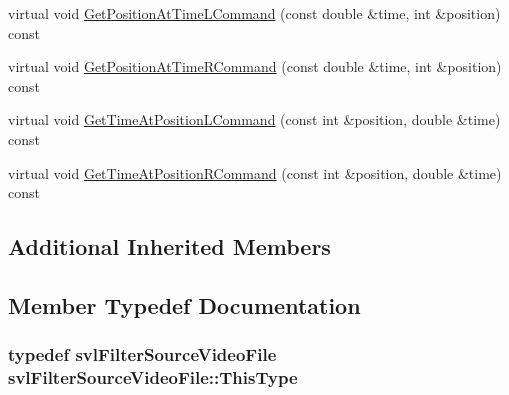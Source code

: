 \begin{DoxyCompactItemize}
\item 
virtual void \hyperlink{classsvl_filter_source_video_file_aeb8abbf0567077cc07192673abffff85}{Get\-Position\-At\-Time\-L\-Command} (const double \&time, int \&position) const 
\item 
virtual void \hyperlink{classsvl_filter_source_video_file_a5ae65a28b1825cd1fb7e85352e42ae11}{Get\-Position\-At\-Time\-R\-Command} (const double \&time, int \&position) const 
\item 
virtual void \hyperlink{classsvl_filter_source_video_file_ad48693c74ac3385a992b8d70c402328e}{Get\-Time\-At\-Position\-L\-Command} (const int \&position, double \&time) const 
\item 
virtual void \hyperlink{classsvl_filter_source_video_file_a96d2938f3efb2c427021b17bad5b8976}{Get\-Time\-At\-Position\-R\-Command} (const int \&position, double \&time) const 
\end{DoxyCompactItemize}
\subsection*{Additional Inherited Members}


\subsection{Member Typedef Documentation}
\hypertarget{classsvl_filter_source_video_file_a64bb04cd76d1088e40860d6f0d2e1897}{
\subsubsection[{This\-Type}]{\setlength{\rightskip}{0pt plus 5cm}typedef {\bf svl\-Filter\-Source\-Video\-File} {\bf svl\-Filter\-Source\-Video\-File\-::\-This\-Type}\hspace{0.3cm}{\ttfamily [protected]}}}\label{classsvl_filter_source_video_file_a64bb04cd76d1088e40860d6f0d2e1897}


